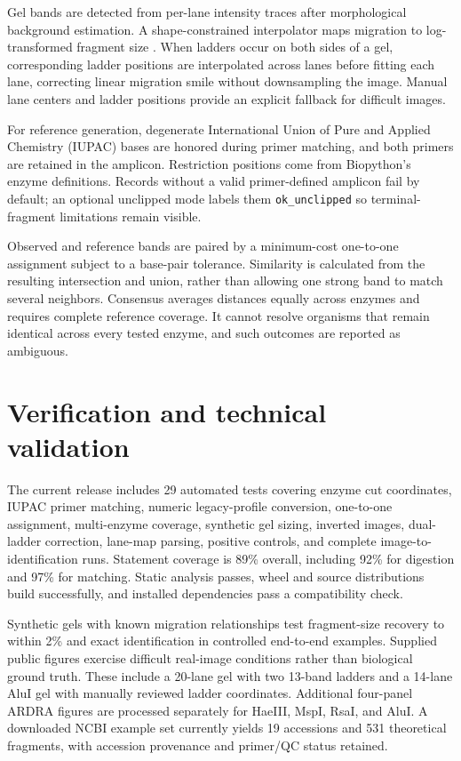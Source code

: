 \documentclass[
  11pt]{article}
\begin{document}
Gel bands are detected from per-lane intensity traces after
morphological background estimation. A shape-constrained interpolator
maps migration to log-transformed fragment size
\citep{fritsch1980pchip}. When ladders occur on both sides of a gel,
corresponding ladder positions are interpolated across lanes before
fitting each lane, correcting linear migration smile without
downsampling the image. Manual lane centers and ladder positions provide
an explicit fallback for difficult images.

For reference generation, degenerate International Union of Pure and
Applied Chemistry (IUPAC) bases are honored during primer matching, and
both primers are retained in the amplicon. Restriction positions come
from Biopython's enzyme definitions. Records without a valid
primer-defined amplicon fail by default; an optional unclipped mode
labels them \texttt{ok\_unclipped} so terminal-fragment limitations
remain visible.

Observed and reference bands are paired by a minimum-cost one-to-one
assignment subject to a base-pair tolerance. Similarity is calculated
from the resulting intersection and union, rather than allowing one
strong band to match several neighbors. Consensus averages distances
equally across enzymes and requires complete reference coverage. It
cannot resolve organisms that remain identical across every tested
enzyme, and such outcomes are reported as ambiguous.

\section{Verification and technical
validation}\label{verification-and-technical-validation}

The current release includes 29 automated tests covering enzyme cut
coordinates, IUPAC primer matching, numeric legacy-profile conversion,
one-to-one assignment, multi-enzyme coverage, synthetic gel sizing,
inverted images, dual-ladder correction, lane-map parsing, positive
controls, and complete image-to-identification runs. Statement coverage
is 89\% overall, including 92\% for digestion and 97\% for matching.
Static analysis passes, wheel and source distributions build
successfully, and installed dependencies pass a compatibility check.

Synthetic gels with known migration relationships test fragment-size
recovery to within 2\% and exact identification in controlled end-to-end
examples. Supplied public figures exercise difficult real-image
conditions rather than biological ground truth. These include a 20-lane
gel with two 13-band ladders and a 14-lane AluI gel with manually
reviewed ladder coordinates. Additional four-panel ARDRA figures are
processed separately for HaeIII, MspI, RsaI, and AluI. A downloaded NCBI
example set currently yields 19 accessions and 531 theoretical
fragments, with accession provenance and primer/QC status retained.
\end{document}

